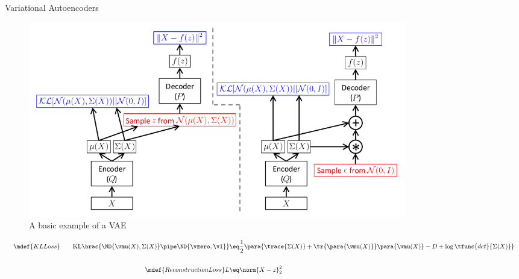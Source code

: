 \documentclass[14pt, landscape]{article}
\begin{document}
\begin{center}
	{\fontsize{16}{12}\selectfont Variational Autoencoders}
\end{center}

\vspace{10mm}

\begin{figure}[h!]
	\centering
	\includegraphics[width=0.8\textwidth]{vae.png}
	\caption{A basic example of a VAE}
\end{figure}


{\fontsize{13}{12}\selectfont
	\begin{align*}
		&&\mdef{KL Loss} \quad\quad	\text{KL}\brac{\ND{\vmu(X), \Sigma(X)} \pipe \ND{\vzero, \vI}}	&\eq	\frac{1}{2} \para{\trace{\Sigma(X)} + \tr{\para{\vmu(X)}} \para{\vmu(X)} - D + \log{\tfunc{det}{\Sigma(X)}}}& \\
		\\
		&&\mdef{Reconstruction Loss} L	&\eq	\norm{X - z}_2^2 &
	\end{align*}
}
\end{document}
